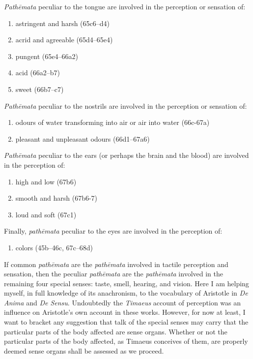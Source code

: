 \emph{Pathēmata} peculiar to the tongue are involved in the perception or sensation of:
\begin{enumerate}
	\item astringent and harsh (65c6--d4)
	\item acrid and agreeable (65d4--65e4)
	\item pungent (65e4--66a2)
	\item acid (66a2--b7)
	\item sweet (66b7--c7)
\end{enumerate}
	

\emph{Pathēmata} peculiar to the nostrils are involved in the perception or sensation of:
\begin{enumerate}
	\item odours of water transforming into air or air into water (66c-67a)
	\item pleasant and unpleasant odours (66d1--67a6)
\end{enumerate}
	
\emph{Pathēmata} peculiar to the ears (or perhaps the brain and the blood) are involved in the perception of:
\begin{enumerate}
	\item high and low (67b6)
	\item smooth and harsh (67b6-7)
	\item loud and soft (67c1)
\end{enumerate}
	
Finally, \emph{pathēmata} peculiar to the eyes are involved in the perception of:
\begin{enumerate}
	\item colors (45b--46c, 67c--68d)
\end{enumerate}
	
If common \emph{pathēmata} are the \emph{pathēmata} involved in tactile perception and sensation, then the peculiar \emph{pathēmata} are the \emph{pathēmata} involved in the remaining four special senses: taste, smell, hearing, and vision. Here I am helping myself, in full knowledge of its anachronism, to the vocabulary of Aristotle in \emph{De Anima} and \emph{De Sensu}. Undoubtedly the \emph{Timaeus} account of perception was an influence on Aristotle's own account in these works. However, for now at least, I want to bracket any suggestion that talk of the special senses may carry that the particular parts of the body affected are sense organs. Whether or not the particular parts of the body affected, as Timaeus conceives of them, are properly deemed sense organs shall be assessed as we proceed.

